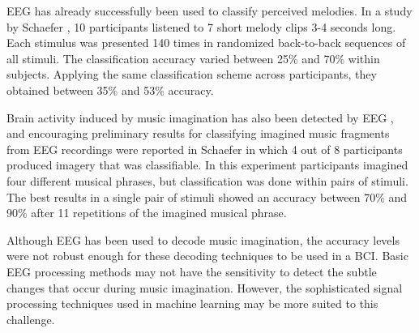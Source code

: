 EEG has already successfully been used to classify perceived melodies. 
In a study by Schaefer \etal \citeyear{schaefer_name_2011}, 10 participants listened to 7 short melody clips 3-4 seconds long.
Each stimulus was presented 140 times in randomized back-to-back sequences of all stimuli.
The classification accuracy varied between 25\% and 70\% within subjects.
Applying the same classification scheme across participants, they obtained between 35\% and 53\% accuracy.

Brain activity induced by music imagination has also been detected by \ac{EEG} \cite{schaefer_shared_2013}, and encouraging preliminary results for classifying imagined music fragments from \ac{EEG} recordings were reported in Schaefer \etal \citeyear{schaefer_single_2009} in which 4 out of 8 participants produced imagery that was classifiable. 
In this experiment participants imagined four different musical phrases, but classification was done within pairs of stimuli.
The best results in a single pair of stimuli showed an accuracy between 70\% and 90\% after 11 repetitions of the imagined musical phrase. 

Although \ac{EEG} has been used to decode music imagination, the accuracy levels were not robust enough for these decoding techniques to be used in a \ac{BCI}. 
Basic EEG processing methods may not have the sensitivity to detect the subtle changes that occur during music imagination. 
However, the sophisticated signal processing techniques used in machine learning may be more suited to this challenge. 

